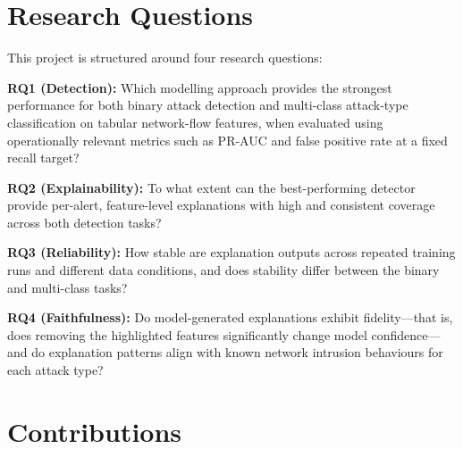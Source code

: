 \documentclass[12pt,a4paper]{report}
\begin{document}
\section{Research Questions}
\label{sec:rqs}

This project is structured around four research questions:

\noindent\textbf{RQ1 (Detection):} Which modelling approach provides the strongest performance for both binary attack detection and multi-class attack-type classification on tabular network-flow features, when evaluated using operationally relevant metrics such as PR-AUC and false positive rate at a fixed recall target?

\noindent\textbf{RQ2 (Explainability):} To what extent can the best-performing detector provide per-alert, feature-level explanations with high and consistent coverage across both detection tasks?

\noindent\textbf{RQ3 (Reliability):} How stable are explanation outputs across repeated training runs and different data conditions, and does stability differ between the binary and multi-class tasks?

\noindent\textbf{RQ4 (Faithfulness):} Do model-generated explanations exhibit fidelity---that is, does removing the highlighted features significantly change model confidence---and do explanation patterns align with known network intrusion behaviours for each attack type?

\section{Contributions}
\label{sec:contributions}
\end{document}

